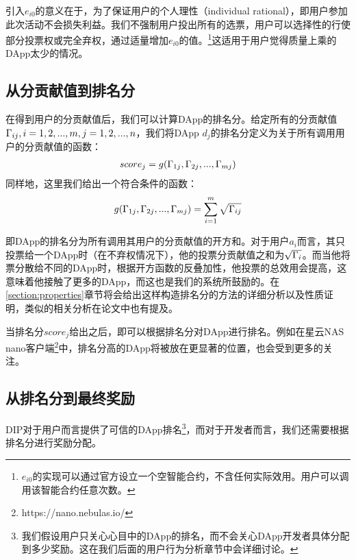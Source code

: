 引入$e_{i0}$的意义在于，为了保证用户的个人理性（individual rational），即用户参加此次活动不会损失利益。我们不强制用户投出所有的选票，用户可以选择性的行使部分投票权或完全弃权，通过适量增加$e_{i0}$的值。\footnote{$e_{i0}$的实现可以通过官方设立一个空智能合约，不含任何实际效用。用户可以调用该智能合约任意次数。}这适用于用户觉得质量上乘的DApp太少的情况。


\subsection{从分贡献值到排名分}
在得到用户的分贡献值后，我们可以计算DApp的排名分。给定所有的分贡献值$\Gamma_{ij}, i=1,2,...,m,j=1,2,...,n$，我们将DApp $d_j$的排名分定义为关于所有调用用户的分贡献值的函数：
\begin{align}
score_j = g(\Gamma_{1j},\Gamma_{2j},...,\Gamma_{mj})
\end{align}
同样地，这里我们给出一个符合条件的函数：
\begin{align}
g(\Gamma_{1j},\Gamma_{2j},...,\Gamma_{mj}) = \sum_{i=1}^m \sqrt{\Gamma_{ij}}
\end{align}

即DApp的排名分为所有调用其用户的分贡献值的开方和。对于用户$a_i$而言，其只投票给一个DApp时（在不弃权情况下），他的投票分贡献值之和为$\sqrt{\Gamma_i}$。而当他将票分散给不同的DApp时，根据开方函数的反叠加性，他投票的总效用会提高，这意味着他接触了更多的DApp，而这也是我们的系统所鼓励的。在\ref{section:properties}章节将会给出这样构造排名分的方法的详细分析以及性质证明，类似的相关分析在论文\cite{buterin2018liberal}中也有提及。


当排名分$score_j$给出之后，即可以根据排名分对DApp进行排名。例如在星云NAS nano客户端\footnote{https://nano.nebulas.io/}中，排名分高的DApp将被放在更显著的位置，也会受到更多的关注。


\subsection{从排名分到最终奖励}
DIP对于用户而言提供了可信的DApp排名\footnote{我们假设用户只关心心目中的DApp的排名，而不会关心DApp开发者具体分配到多少奖励。这在我们后面的用户行为分析章节中会详细讨论。}，而对于开发者而言，我们还需要根据排名分进行奖励分配。

